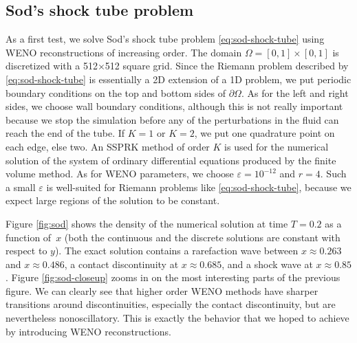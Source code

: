 \subsection*{Sod's shock tube problem}
As a first test, we solve Sod's shock tube problem
\eqref{eq:sod-shock-tube} using WENO reconstructions of increasing order.
The domain $\Omega = [0,1] \times [0,1]$ is discretized with
a 512$\times$512 square grid. Since the Riemann problem
described by \eqref{eq:sod-shock-tube} is essentially
a 2D extension of a 1D problem, we put periodic boundary conditions
on the top and bottom sides of $\partial\Omega$.
As for the left and right sides, we choose wall boundary conditions,
although this is not really important because we stop the
simulation before any of the perturbations in the fluid can reach
the end of the tube.
If $K = 1$ or $K = 2$, we put one quadrature point on each edge, else two.
An SSPRK method of order $K$ is used for the numerical solution
of the system of ordinary differential equations produced by the
finite volume method. As for WENO parameters, we choose
$\varepsilon = 10^{-12}$ and $r = 4$. Such a small $\varepsilon$
is well-suited for Riemann problems like \eqref{eq:sod-shock-tube},
because we expect large regions of the solution to be constant.

Figure \ref{fig:sod} shows the density of the numerical solution
at time $T = 0.2$ as a function of~$x$ (both the continuous and the discrete
solutions are constant with respect to $y$). The exact solution contains
a rarefaction wave between $x \approx 0.263$ and $x \approx 0.486$,
a contact discontinuity at $x \approx 0.685$, and a shock wave at $x \approx 0.85$.
Figure \ref{fig:sod-closeup} zooms in on the most interesting
parts of the previous figure. We can clearly see that higher order
WENO methods have sharper transitions around discontinuities,
especially the contact discontinuity, but are nevertheless nonoscillatory.
This is exactly the behavior that we hoped to achieve by introducing
WENO reconstructions.

